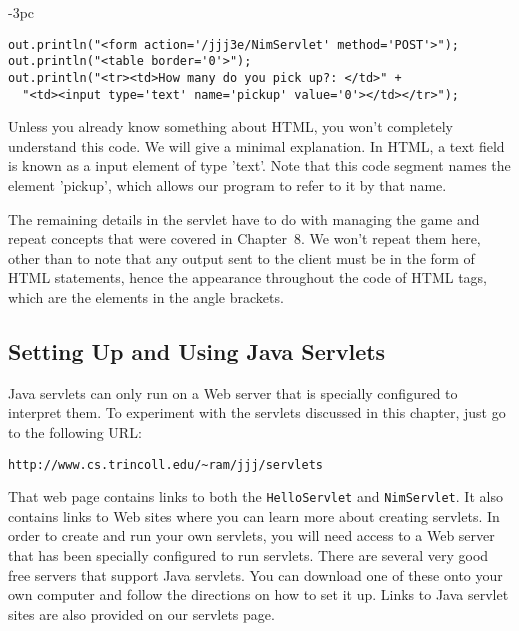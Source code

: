 \begin{jjjlistingleft}[29pc]{-3pc}
\begin{lstlisting}
out.println("<form action='/jjj3e/NimServlet' method='POST'>");
out.println("<table border='0'>");
out.println("<tr><td>How many do you pick up?: </td>" +
  "<td><input type='text' name='pickup' value='0'></td></tr>");
\end{lstlisting}
\end{jjjlistingleft}

\noindent Unless you already know something about HTML, you won't
completely understand this code. We will give a minimal
explanation. In HTML, a text field is known as a input element of type
'text'.  Note that this code segment names the element 'pickup', which
allows our program to refer to it by that name.

The remaining details in the servlet have to do with managing the game
and repeat concepts that were covered in Chapter~8. We won't repeat
them here, other than to note that any output sent to the client must
be in the form of HTML statements, hence the appearance throughout the
code of HTML tags, which are the elements in the angle brackets.

\subsection{Setting Up and Using Java Servlets}

Java servlets can only run on a Web server that is specially
configured to interpret them.  To experiment with
the servlets discussed in this chapter, just go to the
following URL:

\begin{jjjlisting}
\begin{lstlisting}[commentstyle=\color{black}]
http://www.cs.trincoll.edu/~ram/jjj/servlets
\end{lstlisting}
\end{jjjlisting}

\noindent That web page contains links to both the {\tt HelloServlet}
and {\tt NimServlet}.  It also contains links to Web sites where you
can learn more about creating servlets. In order to create and run
your own servlets, you will need access to a Web server that has been
specially configured to run servlets.  There are several very good
free servers that support Java servlets. You can download one of these
onto your own computer and follow the directions on how to set it up.
Links to Java servlet sites are also provided on our servlets page. 


